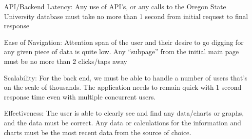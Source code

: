 \documentclass[onecolumn, draftclsnofoot,10pt, compsoc]{IEEEtran}
\begin{document}
	API/Backend Latency:  Any use of API’s, or any calls to the Oregon State University database must take no more than 1 second from initial request to final response
	
	Ease of Navigation: Attention span of the user and their desire to go digging for any given piece of data is quite low. Any “subpage” from the initial main page must be no 	more than 2 clicks/taps away
	
	Scalability: For the back end, we must be able to handle a number of users that's on the scale of thousands. The application needs to remain quick with 1 second response 	time even with multiple concurrent users. 
	
	Effectiveness:  The user is able to clearly see and find any data/charts or graphs, and the data must be correct. Any data or calculations for the information and charts 	must be the most recent data from the source of choice.
	
\end{document}
